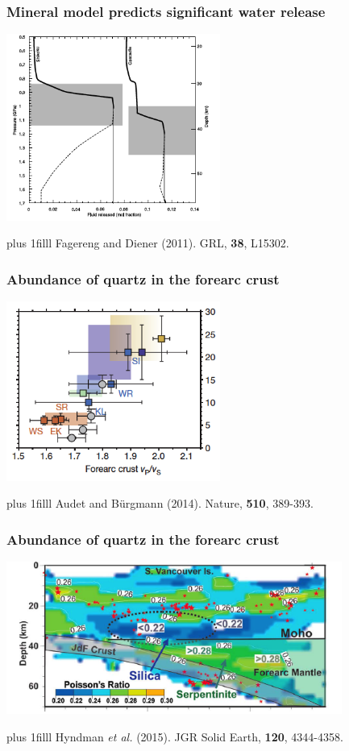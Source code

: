 \documentclass{beamer}
\newcommand{\btVFill}{\vskip0pt plus 1filll}
\begin{document}
	\begin{frame}
		\frametitle{Mineral model predicts significant water release}
		\begin{center}
			\includegraphics[trim={0cm 0cm 0cm 0cm}, clip, width=7cm]{articles/fagereng_diener_2011_2.png}
		\end{center}
		\btVFill
		\tiny{Fagereng and Diener (2011). GRL, \textbf{38}, L15302.}
	\end{frame}

	\begin{frame}
		\frametitle{Abundance of quartz in the forearc crust}
		\begin{center}
			\includegraphics[trim={0cm 0cm 0cm 0cm}, clip, width=7cm]{articles/audet_burgmann_2014_1c.png}
		\end{center}
		\btVFill
		\tiny{Audet and B\"urgmann (2014). Nature, \textbf{510}, 389-393.}
	\end{frame}

	\begin{frame}
		\frametitle{Abundance of quartz in the forearc crust}
		\begin{center}
			\includegraphics[trim={0cm 0cm 0cm 0cm}, clip, width=11cm]{articles/hyndmann_al_2015_8a.png}
		\end{center}
		\btVFill
		\tiny{Hyndman \textit{et al.} (2015). JGR Solid Earth, \textbf{120}, 4344-4358.}
	\end{frame}
\end{document}
